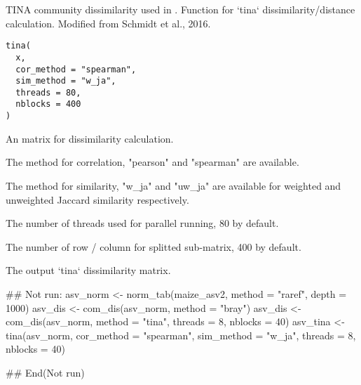 \documentclass[a4paper]{book}
\begin{document}
%
\begin{Description}\relax
TINA community dissimilarity used in .
Function for `tina` dissimilarity/distance calculation. Modified from Schmidt
et al., 2016.
\end{Description}
%
\begin{Usage}
\begin{verbatim}
tina(
  x,
  cor_method = "spearman",
  sim_method = "w_ja",
  threads = 80,
  nblocks = 400
)
\end{verbatim}
\end{Usage}
%
\begin{Arguments}
\begin{ldescription}
\item[\code{x}] An matrix for dissimilarity calculation.

\item[\code{cor\_method}] The method for correlation, "pearson" and "spearman" are
available.

\item[\code{sim\_method}] The method for similarity, "w\_ja" and "uw\_ja" are
available for weighted and unweighted Jaccard similarity respectively.

\item[\code{threads}] The number of threads used for parallel running, 80 by
default.

\item[\code{nblocks}] The number of row / column for splitted sub-matrix, 400 by
default.
\end{ldescription}
\end{Arguments}
%
\begin{Value}
The output `tina` dissimilarity matrix.
\end{Value}
%
\begin{Examples}
\begin{ExampleCode}
## Not run: 
asv_norm <- norm_tab(maize_asv2, method = "raref", depth = 1000)
asv_dis <- com_dis(asv_norm, method = "bray")
asv_dis <- com_dis(asv_norm, method = "tina", threads = 8, nblocks = 40)
asv_tina <- tina(asv_norm, cor_method = "spearman", sim_method = "w_ja",
threads = 8, nblocks = 40)

## End(Not run)
\end{ExampleCode}
\end{Examples}
\end{document}
